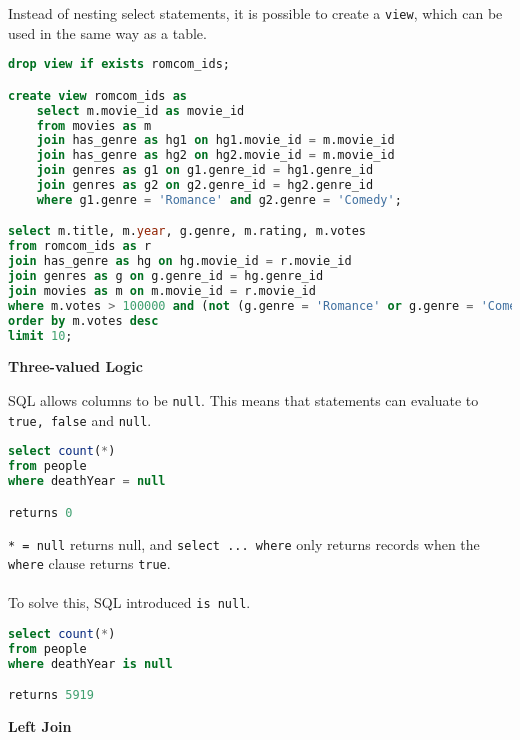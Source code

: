 \documentclass[12pt,a4paper]{article} %
\begin{document}
Instead of nesting select statements, it is possible to create a \verb|view|, which can be used in the same way as a table.
\begin{lstlisting}[language=sql]
drop view if exists romcom_ids;

create view romcom_ids as
    select m.movie_id as movie_id
    from movies as m
    join has_genre as hg1 on hg1.movie_id = m.movie_id
    join has_genre as hg2 on hg2.movie_id = m.movie_id
    join genres as g1 on g1.genre_id = hg1.genre_id
    join genres as g2 on g2.genre_id = hg2.genre_id
    where g1.genre = 'Romance' and g2.genre = 'Comedy';

select m.title, m.year, g.genre, m.rating, m.votes
from romcom_ids as r
join has_genre as hg on hg.movie_id = r.movie_id
join genres as g on g.genre_id = hg.genre_id
join movies as m on m.movie_id = r.movie_id
where m.votes > 100000 and (not (g.genre = 'Romance' or g.genre = 'Comedy'))
order by m.votes desc
limit 10;
\end{lstlisting}
\textbf{Three-valued Logic}

SQL allows columns to be \verb|null|. This means that statements can evaluate to \verb|true, false| and \verb|null|.
\begin{lstlisting}[language=sql]
select count(*)
from people
where deathYear = null

returns 0
\end{lstlisting}
\verb|* = null| returns null, and \verb|select ... where| only returns records when the \verb|where| clause returns \verb|true|. 
\\\\
To solve this, SQL introduced \verb|is null|.
\begin{lstlisting}[language=sql]
select count(*)
from people
where deathYear is null

returns 5919
\end{lstlisting}
\textbf{Left Join}
\end{document}
